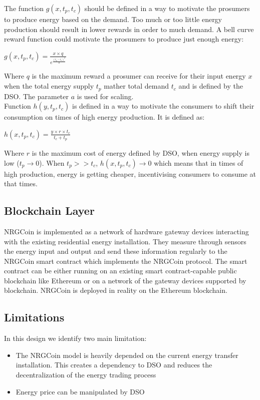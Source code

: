 The function $g(x,t_p,t_c)$ should be defined in a way to motivate the prosumers to produce energy based on the demand. Too much or too little energy production should result in lower
rewards in order to much demand. A bell curve reward function could motivate the prosumers to produce just enough energy:
\\
\begin{center}
    \begin{math}
        g(x,t_p,t_c) = \frac{x \times q}{e^\frac{(t_p-t_c)^2}{a}}
    \end{math}
\end{center}

Where $q$ is the maximum reward a prosumer can receive for their input energy $x$ when the total energy supply $t_p$ mather total demand $t_c$ and is defined by the DSO.
The parameter $a$ is used for scaling.\\
Function $h(y,t_p,t_c)$ is defined in a way to motivate the consumers to shift their consumption on times of high energy production. It is defined as:
\begin{center}
    \begin{math}
        h(x,t_p,t_c) = \frac{y \times r \times t_c}{t_c+t_p}
    \end{math}
\end{center}
Where $r$ is the maximum cost of energy defined by DSO, when energy supply is low ($t_p\rightarrow0$).
When $t_p >> t_c$, $h(x,t_p,t_c)\rightarrow0$ which means that in times of high production, energy is getting cheaper, incentivising consumers to consume at that times.

\subsection{Blockchain Layer}

NRGCoin is implemented as a network of hardware gateway devices interacting with the existing residential energy installation. They measure through sensors the energy
input and output and send these information regularly to the NRGCoin smart contract which implements the NRGCoin protocol. The smart contract can be either running on an
existing smart contract-capable public blockchain like Ethereum or on a network of the gateway devices supported by blockchain.
NRGCoin is deployed in reality on the Ethereum blockchain.
\cite{NRGCoin2}

\subsection{Limitations}
In this design we identify two main limitation:
\begin{itemize}
    \item The NRGCoin model is heavily depended on the current energy transfer installation. This creates a dependency to DSO and reduces the decentralization of the energy trading process
    \item Energy price can be manipulated by DSO
\end{itemize}

